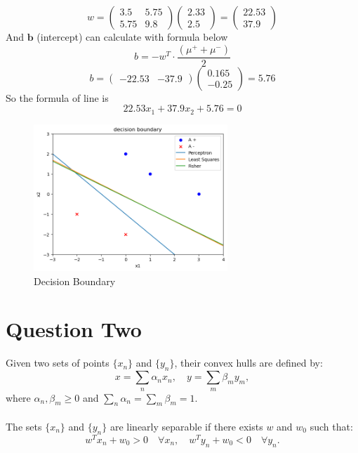 \documentclass[a4paper, 11pt]{article}
\begin{document}
	\[
	w =  
	\begin{pmatrix} 
		3.5 & 5.75 \\
		5.75 & 9.8
	\end{pmatrix}
	\begin{pmatrix} 
		2.33 \\
		2.5
	\end{pmatrix}
	=
	\begin{pmatrix} 
		22.53 \\
		37.9
	\end{pmatrix}
	\]
	And $\mathbf{b}$ (intercept) can calculate with formula below
	\[
	b = - w^T \cdot \frac{(\mu^+ + \mu^-)}{2}
	\]
	\[
	b =
	\begin{pmatrix} 
		-22.53 & -37.9
	\end{pmatrix}
	\begin{pmatrix} 
		0.165 \\ 
		-0.25
	\end{pmatrix}
	= 5.76
	\]
	So the formula of line is 
	\[
	22.53 x_1 + 37.9 x_2 + 5.76 = 0
	\]
	\begin{figure}[h!]
		\centering
		\includegraphics[width=0.65\textwidth]{images/q1.png}
		\caption{Decision Boundary}
		\label{fig:decision-boundary}
	\end{figure}
	
	\newpage
	\section{Question Two}
	
	Given two sets of points \( \{x_n\} \) and \( \{y_n\} \), their convex hulls are defined by:
	\[
	x = \sum_n \alpha_n x_n, \quad y = \sum_m \beta_m y_m,
	\]
	where \( \alpha_n, \beta_m \geq 0 \) and \( \sum_n \alpha_n = \sum_m \beta_m = 1 \).
	\\\\
	The sets \( \{x_n\} \) and \( \{y_n\} \) are linearly separable if there exists \( w \) and \( w_0 \) such that:
	\[
	w^T x_n + w_0 > 0 \quad \forall x_n, \quad w^T y_n + w_0 < 0 \quad \forall y_n.
	\]
	
\end{document}
